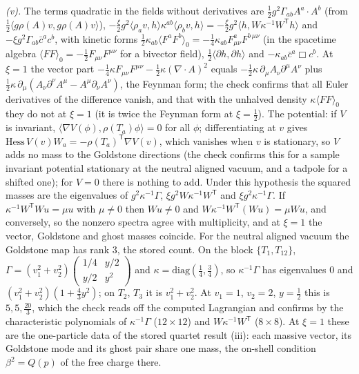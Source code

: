 \emph{(v).} The terms quadratic in the fields without derivatives are $\tfrac12g^{2}\Gamma_{ab}A^{a}\cdot A^{b}$ (from $\tfrac12\langle g\rho(A)v, g\rho(A)v\rangle$), $-\tfrac{\xi}{2}g^{2}\langle\rho_{a}v, h\rangle\kappa^{ab}\langle\rho_{b}v, h\rangle = -\tfrac{\xi}{2}g^{2}\langle h, W\kappa^{-1}W^{\mathsf T}h\rangle$ and $-\xi g^{2}\Gamma_{ab}\bar c^{a}c^{b}$, with kinetic forms $\tfrac12\kappa_{ab}\langle F^{a}F^{b}\rangle_{0} = -\tfrac14\kappa_{ab}F^{a}_{\mu\nu}F^{b\,\mu\nu}$ (in the spacetime algebra $\langle FF\rangle_{0} = -\tfrac12F_{\mu\nu}F^{\mu\nu}$ for a bivector field), $\tfrac12\langle\partial h, \partial h\rangle$ and $-\kappa_{ab}\bar c^{a}\Box c^{b}$. At $\xi = 1$ the vector part $-\tfrac14\kappa F_{\mu\nu}F^{\mu\nu} - \tfrac12\kappa(\nabla\cdot A)^{2}$ equals $-\tfrac12\kappa\,\partial_\mu A_{\nu}\partial^{\mu}A^{\nu}$ plus $\tfrac12\kappa\,\partial_\mu(A_{\nu}\partial^{\nu}A^{\mu} - A^{\mu}\partial_{\nu}A^{\nu})$, the Feynman form; the check confirms that all Euler derivatives of the difference vanish, and that with the unhalved density $\kappa\langle FF\rangle_{0}$ they do not at $\xi = 1$ (it is twice the Feynman form at $\xi = \tfrac12$). The potential: if $V$ is invariant, $\langle\nabla V(\phi), \rho(T_{a})\phi\rangle = 0$ for all $\phi$; differentiating at $v$ gives $\mathrm{Hess}\,V(v)W_{a} = -\rho(T_{a})^{\mathsf T}\nabla V(v)$, which vanishes when $v$ is stationary, so $V$ adds no mass to the Goldstone directions (the check confirms this for a sample invariant potential stationary at the neutral aligned vacuum, and a tadpole for a shifted one); for $V = 0$ there is nothing to add. Under this hypothesis the squared masses are the eigenvalues of $g^{2}\kappa^{-1}\Gamma$, $\xi g^{2}W\kappa^{-1}W^{\mathsf T}$ and $\xi g^{2}\kappa^{-1}\Gamma$. If $\kappa^{-1}W^{\mathsf T}Wu = \mu u$ with $\mu \ne 0$ then $Wu \ne 0$ and $W\kappa^{-1}W^{\mathsf T}(Wu) = \mu Wu$, and conversely, so the nonzero spectra agree with multiplicity, and at $\xi = 1$ the vector, Goldstone and ghost masses coincide. For the neutral aligned vacuum the Goldstone map has rank $3$, the stored count. On the block $\{T_{1}, T_{12}\}$, $\Gamma = (v_{1}^{2} + v_{2}^{2})\left(\begin{smallmatrix}1/4 & y/2\\ y/2 & y^{2}\end{smallmatrix}\right)$ and $\kappa = \mathrm{diag}(\tfrac14, \tfrac34)$, so $\kappa^{-1}\Gamma$ has eigenvalues $0$ and $(v_{1}^{2} + v_{2}^{2})(1 + \tfrac43y^{2})$; on $T_{2}$, $T_{3}$ it is $v_{1}^{2} + v_{2}^{2}$. At $v_{1} = 1$, $v_{2} = 2$, $y = \tfrac12$ this is $5, 5, \tfrac{20}{3}$, which the check reads off the computed Lagrangian and confirms by the characteristic polynomials of $\kappa^{-1}\Gamma$ ($12 \times 12$) and $W\kappa^{-1}W^{\mathsf T}$ ($8 \times 8$). At $\xi = 1$ these are the one-particle data of the stored quartet result (iii): each massive vector, its Goldstone mode and its ghost pair share one mass, the on-shell condition $\beta^{2} = Q(p)$ of the free charge there.

